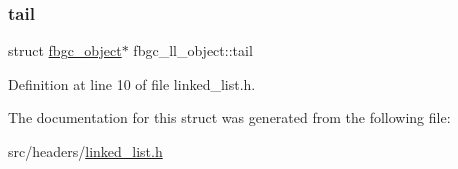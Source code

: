 \mbox{\label{structfbgc__ll__object_afa4c109a8bc5b6e544623d01a1ecf0ac}} 
\subsubsection{\texorpdfstring{tail}{tail}}
{\footnotesize\ttfamily struct \hyperlink{structfbgc__object}{fbgc\+\_\+object}$\ast$ fbgc\+\_\+ll\+\_\+object\+::tail}



Definition at line 10 of file linked\+\_\+list.\+h.



The documentation for this struct was generated from the following file\+:\begin{DoxyCompactItemize}
\item 
src/headers/\hyperlink{linked__list_8h}{linked\+\_\+list.\+h}\end{DoxyCompactItemize}
